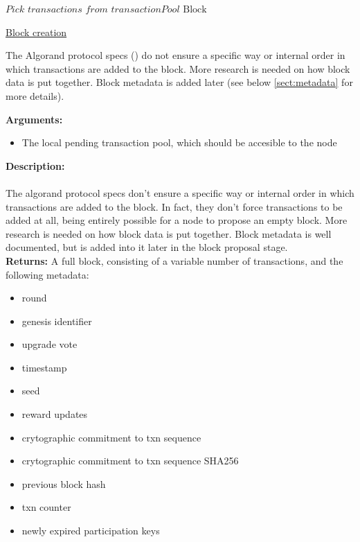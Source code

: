\documentclass[10pt,a4paper]{article}
\begin{document}
\begin{algorithm}
    \begin{algorithmic}[1]
    
    \State $Pick$ $transactions$ $from$ $transactionPool$
    \State \Return $\mathrm{Block}$    
    \EndFunction
    \end{algorithmic}
    \caption{\underline{Block creation}}
    \label{alg:fuerza_bruta}
\end{algorithm}

The Algorand protocol specs (\cite{algorand}) do not ensure a specific way 
or internal order in which transactions are added to the block.
More research is needed on how block data is put together.
Block metadata is added later (see below \ref{sect:metadata} for more 
details).

\noindent \textbf{Arguments:}
\begin{itemize}
    \item The local pending transaction pool, which should be accesible to the node\\
  \end{itemize}

\noindent \textbf{Description:}\\
\\
The algorand protocol specs don't ensure a specific way or internal order in which transactions are added to the block.
In fact, they don't force transactions to be added at all, being entirely possible for a node to propose an empty block.
More research is needed on how block data is put together.
Block metadata is well documented, but is added into it later in the block proposal stage.\\

\noindent \textbf{Returns:} A full block, consisting of a variable number of transactions, and the following metadata:
\begin{itemize}
    \item round
    \item genesis identifier
    \item upgrade vote
    \item timestamp
    \item seed
    \item reward updates
    \item crytographic commitment to txn sequence
    \item crytographic commitment to txn sequence SHA256
    \item previous block hash
    \item txn counter
    \item newly expired participation keys
  \end{itemize}
\end{document}
